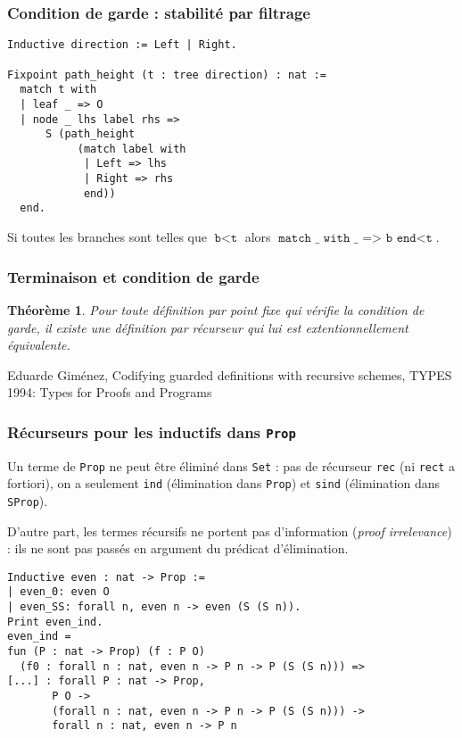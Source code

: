\documentclass{beamer}
\newtheorem{theoreme}{Théorème}
\begin{document}
\begin{frame}[fragile]
  \frametitle{Condition de garde : stabilité par filtrage}

\begin{verbatim}
Inductive direction := Left | Right.

Fixpoint path_height (t : tree direction) : nat :=
  match t with
  | leaf _ => O
  | node _ lhs label rhs =>
      S (path_height
           (match label with
            | Left => lhs
            | Right => rhs
            end))
  end.
\end{verbatim}

Si toutes les branches sont telles que \(\texttt{b} < \texttt{t}\) alors
 \(\texttt{match _ with _ => b end} < \texttt{t}\).
\end{frame}
\begin{frame}[fragile]
  \frametitle{Terminaison et condition de garde}

  \vfill
  
  \begin{theoreme}
    Pour toute définition par point fixe qui vérifie la condition de garde,
    il existe une définition par récurseur qui lui est extentionnellement équivalente.
  \end{theoreme}

  \vfill

  Eduarde Giménez, Codifying guarded definitions with recursive schemes,
  TYPES 1994: Types for Proofs and Programs

  \vfill
\end{frame}
\begin{frame}[fragile]
  \frametitle{Récurseurs pour les inductifs dans \texttt{Prop}}

  Un terme de \texttt{Prop} ne peut être éliminé dans
  \texttt{Set} : pas de récurseur \texttt{rec} (ni
  \texttt{rect} a fortiori), on a seulement
  \texttt{ind} (élimination dans \texttt{Prop})
  et \texttt{sind} (élimination dans \texttt{SProp}).


  D'autre part, les termes récursifs ne portent pas d'information
  (\emph{proof irrelevance}) : ils ne sont pas passés en argument
  du prédicat d'élimination.

\begin{verbatim}
Inductive even : nat -> Prop :=
| even_0: even O
| even_SS: forall n, even n -> even (S (S n)).
Print even_ind.
even_ind =
fun (P : nat -> Prop) (f : P O)
  (f0 : forall n : nat, even n -> P n -> P (S (S n))) =>
[...] : forall P : nat -> Prop,
       P O ->
       (forall n : nat, even n -> P n -> P (S (S n))) ->
       forall n : nat, even n -> P n
\end{verbatim}
\end{frame}
\end{document}
